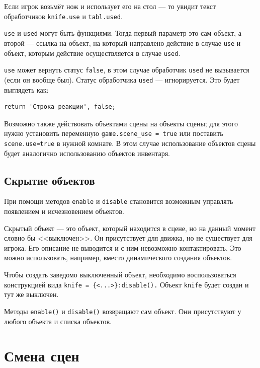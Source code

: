 \documentclass[a4paper,12pt]{article}
\begin{document}
Если игрок возьмёт нож и использует его на стол --- то увидит текст обработчиков \verb/knife.use/ и \verb/tabl.used/.

\verb/use/ и \verb/used/ могут быть функциями. Тогда первый параметр это сам объект, а второй --- ссылка на объект, на который направлено действие в случае \verb/use/ и объект, которым действие осуществляется в случае \verb/used/.

\verb/use/ может вернуть статус \verb/false/, в этом случае обработчик \verb/used/ не вызывается (если он вообще был). Статус обработчика \verb/used/ --- игнорируется. Это будет выглядеть как:

\begin{verbatim}
return 'Строка реакции', false;
\end{verbatim}

Возможно также действовать объектами сцены на объекты сцены; для этого нужно установить переменную \verb/game.scene_use = true/ или поставить \verb/scene.use=true/ в нужной комнате. В этом случае использование объектов сцены будет аналогично использованию объектов инвентаря.

\subsection{Скрытие объектов}


При помощи методов \verb/enable/ и \verb/disable/ становится возможным управлять появлением и исчезновением объектов.

Скрытый объект --- это объект, который находится в сцене, но на данный момент словно бы <<выключен>>. Он присутствует для движка, но не существует для игрока. Его описание не выводится и с ним невозможно контактировать. Это можно использовать, например, вместо динамического создания объектов.

Чтобы создать заведомо выключенный объект, необходимо воспользоваться конструкцией вида \verb/knife = {<...>}:disable()./
Объект \verb/knife/ будет создан и тут же выключен.

Методы \verb/enable()/ и \verb/disable()/ возвращают сам объект. Они присутствуют у любого объекта и списка объектов.

\section{Смена сцен}

\end{document}
